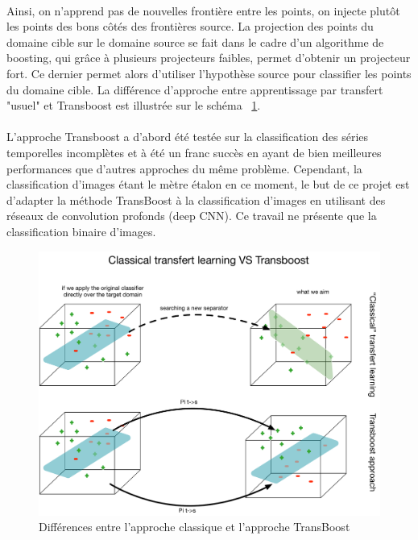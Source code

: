 \documentclass[11 pt]{article}
\begin{document}
\paragraph{}Ainsi, on n'apprend pas de nouvelles frontière entre les points, on injecte plutôt les points des bons côtés des frontières source. La projection des points du domaine cible sur le domaine source se fait dans le cadre d'un algorithme de boosting, qui grâce à plusieurs projecteurs faibles, permet d’obtenir un projecteur fort. Ce dernier permet alors d’utiliser l'hypothèse source pour classifier les points du domaine cible. La différence d'approche entre apprentissage par transfert "usuel" et Transboost est illustrée sur le schéma ~\ref{figDiff}.


\paragraph{}L'approche Transboost a d’abord été testée sur la classification des séries temporelles incomplètes et à été un franc succès en ayant de bien meilleures performances que d’autres approches du même problème. Cependant, la classification d’images étant le mètre étalon en ce moment, le but de ce projet est d’adapter la méthode TransBoost à la classification d’images en utilisant des réseaux de convolution profonds (deep CNN). Ce travail ne présente que la classification binaire d'images.

\begin{figure}[H]
  \includegraphics[width=\textwidth]{fig2.pdf}
  \caption{Différences entre l'approche classique et l'approche TransBoost}
  \label{figDiff}
\end{figure}
\end{document}
